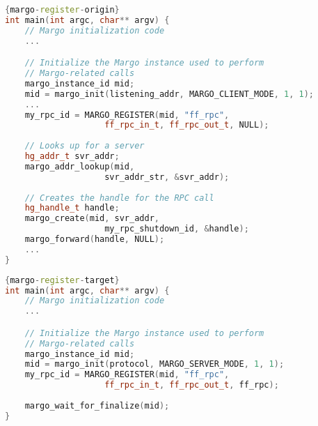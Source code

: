 \begin{center}

\begin{minipage}{.65\textwidth}
\begin{lstlisting}[caption=Finalization of the registration process in the origin node. The register macro specifies the input/output expected types as well as the packing routines as described above.,language=C++, style=mystyle, label=margo-register-origin]{margo-register-origin}
int main(int argc, char** argv) {
    // Margo initialization code
    ...

    // Initialize the Margo instance used to perform
    // Margo-related calls
    margo_instance_id mid;
    mid = margo_init(listening_addr, MARGO_CLIENT_MODE, 1, 1);
    ...
    my_rpc_id = MARGO_REGISTER(mid, "ff_rpc",
                    ff_rpc_in_t, ff_rpc_out_t, NULL);
    
    // Looks up for a server 
    hg_addr_t svr_addr;
    margo_addr_lookup(mid,
                    svr_addr_str, &svr_addr);
    
    // Creates the handle for the RPC call
    hg_handle_t handle;
    margo_create(mid, svr_addr,
                    my_rpc_shutdown_id, &handle);
    margo_forward(handle, NULL);
    ...
}
\end{lstlisting}
\end{minipage}
\end{center}

\begin{center}
\vspace{-0.1cm}
\begin{minipage}{.65\textwidth}
\begin{lstlisting}[caption={Finalization of the registration process in the target node. The listening node only needs to register the RPC types and routines, as the origin node, and additionally it needs to specify the RPC callback for the registered ID.},language=C++, style=mystyle, label=margo-register-target]{margo-register-target}
int main(int argc, char** argv) {
    // Margo initialization code
    ...

    // Initialize the Margo instance used to perform
    // Margo-related calls
    margo_instance_id mid;
    mid = margo_init(protocol, MARGO_SERVER_MODE, 1, 1);
    my_rpc_id = MARGO_REGISTER(mid, "ff_rpc",
                    ff_rpc_in_t, ff_rpc_out_t, ff_rpc);
    
    margo_wait_for_finalize(mid);
}
\end{lstlisting}
\end{minipage}
\end{center}

